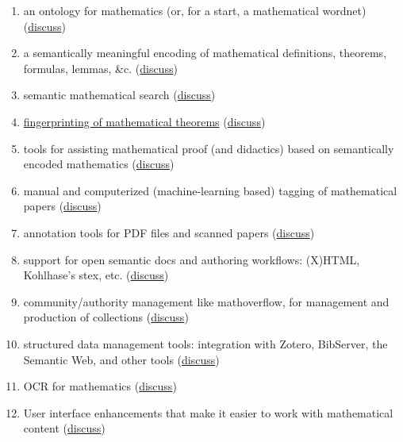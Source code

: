 \documentclass{article}
\begin{document}
\begin{enumerate}
\renewcommand{\theenumi}{\Alph{enumi}}
\item\label{ontology} an ontology for mathematics (or, for a start, a mathematical wordnet) (\href{https://github.com/holtzermann17/skelodml/wiki/A.-An-ontology-for-mathematics}{discuss})
\item\label{encoding} a semantically meaningful encoding of mathematical definitions, theorems, formulas, lemmas, \&c. (\href{https://github.com/holtzermann17/skelodml/wiki/B.-Semantically-meaningful-encodings-of-mathematical-objects}{discuss})
\item\label{search} semantic mathematical search (\href{https://github.com/holtzermann17/skelodml/wiki/C.-Semantic-mathematical-search}{discuss})
\item\label{fingerprinting} \href{http://www.ams.org/notices/201308/rnoti-p1034.pdf}{fingerprinting of mathematical theorems} (\href{https://github.com/holtzermann17/skelodml/wiki/D.-Fingerprinting-of-mathematical-theorems}{discuss})
\item\label{proof} tools for assisting mathematical proof (and didactics) based on semantically encoded mathematics (\href{https://github.com/holtzermann17/skelodml/wiki/E.-Tools-for-assisting-mathematical-proof}{discuss})
\item\label{tagging} manual and computerized (machine-learning based) tagging of mathematical papers (\href{https://github.com/holtzermann17/skelodml/wiki/F.-(semi)automated-tagging-of-mathematical-papers}{discuss})
\item\label{annotation} annotation tools for PDF files and scanned papers (\href{https://github.com/holtzermann17/skelodml/wiki/G.-annotation-tools-for-PDF-files}{discuss})
\item\label{authoring} support for open semantic docs and authoring workflows: (X)HTML, Kohlhase's stex, etc. (\href{https://github.com/holtzermann17/skelodml/wiki/H.-Open-semantic-docs-and-authoring-workflows}{discuss})
\item\label{community} community/authority management like mathoverflow, for management and production of collections (\href{https://github.com/holtzermann17/skelodml/wiki/I.-community-and-authority-management-tools}{discuss})
\item\label{data} structured data management tools: integration with Zotero, BibServer, the Semantic Web, and other tools (\href{https://github.com/holtzermann17/skelodml/wiki/J.-structured-data-management-tools}{discuss})
\item\label{ocr} OCR for mathematics (\href{https://github.com/holtzermann17/skelodml/wiki/K.-OCR-for-mathematics}{discuss})
\item\label{ui} User interface enhancements that make it easier to work with mathematical content (\href{https://github.com/holtzermann17/skelodml/wiki/L.-UI-enhancements}{discuss})
\end{enumerate}
\end{document}
